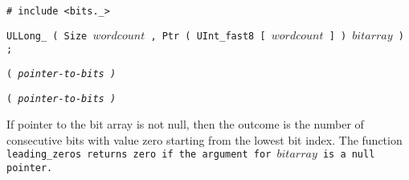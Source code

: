 
\tt{# include <bits._>}

\tt{ULLong_} \s\tt{( Size} $wordcount$
\tt{, Ptr ( UInt_fast8 [} $wordcount$ \tt{] )} $bitarray$ \tt{) ;}

\s\tt{(}
\it{pointer-to-bits} \tt{)}

\s\s\tt{(}
\it{pointer-to-bits} \tt{)}


If pointer to the bit array is not null, then the outcome is the number
of consecutive bits with value zero starting from the lowest bit index.
The function \tt{leading_zeros} returns zero if
the argument for $bitarray$ is a null pointer.

